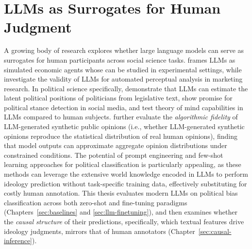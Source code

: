 \section{LLMs as Surrogates for Human Judgment}
\label{sec:rw-llm-surrogates}

A growing body of research explores whether large language models can serve as surrogates for human participants across social science tasks. \citet{horton2023large} frames LLMs as simulated economic agents whose  can be studied in experimental settings, while \citet{li2024frontiers} investigate the validity of LLMs for automated perceptual analysis in marketing research. In political science specifically, \citet{wu2023large} demonstrate that LLMs can estimate the latent political positions of politicians from legislative text, \citet{ibrahim2024analyzingpoliticalstancestwitter} show promise for political stance detection in social media, and \citet{strachan2024testing} test theory of mind capabilities in LLMs compared to human subjects. \citet{ma-etal-2025-algorithmic} further evaluate the \emph{algorithmic fidelity} of LLM-generated synthetic public opinions (i.e., whether LLM-generated synthetic opinions reproduce the statistical distribution of real human opinions), finding that model outputs can approximate aggregate opinion distributions under constrained conditions. The potential of prompt engineering and few-shot learning approaches for political classification is particularly appealing, as these methods can leverage the extensive world knowledge encoded in LLMs to perform ideology prediction without task-specific training data, effectively substituting for costly human annotation. This thesis evaluates modern LLMs on political bias classification across both zero-shot and fine-tuning paradigms (Chapters~\ref{sec:baselines} and \ref{sec:llm-finetuning}), and then examines whether the \textit{causal structure} of their predictions, specifically, which textual features drive ideology judgments, mirrors that of human annotators (Chapter~\ref{sec:causal-inference}).

